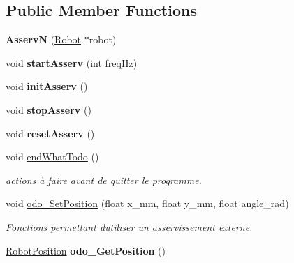 \subsection*{Public Member Functions}
\begin{DoxyCompactItemize}
\item 
\mbox{\label{classAsservN_a9ec913f359490e6840753f10668c7c71}} 
{\bfseries AsservN} (\hyperlink{classRobot}{Robot} $\ast$robot)
\item 
\mbox{\label{classAsservN_a1596b709664aa4a28699b73a931188d3}} 
void {\bfseries start\+Asserv} (int freq\+Hz)
\item 
\mbox{\label{classAsservN_abf37f0e24a183721a424b13ec21911af}} 
void {\bfseries init\+Asserv} ()
\item 
\mbox{\label{classAsservN_a46b2d14de6f0a87194b746d397c09d94}} 
void {\bfseries stop\+Asserv} ()
\item 
\mbox{\label{classAsservN_af84758ee51f6050c7962deaaae54df7b}} 
void {\bfseries reset\+Asserv} ()
\item 
\mbox{\label{classAsservN_a1fc9a48a25f165cb950809d4d88bdb1f}} 
void \hyperlink{classAsservN_a1fc9a48a25f165cb950809d4d88bdb1f}{end\+What\+Todo} ()
\begin{DoxyCompactList}\small\item\em actions à faire avant de quitter le programme. \end{DoxyCompactList}\item 
\mbox{\label{classAsservN_a684b420e77691553692956ba7ab1de3d}} 
void \hyperlink{classAsservN_a684b420e77691553692956ba7ab1de3d}{odo\+\_\+\+Set\+Position} (float x\+\_\+mm, float y\+\_\+mm, float angle\+\_\+rad)
\begin{DoxyCompactList}\small\item\em Fonctions permettant d\textquotesingle{}utiliser un asservissement externe. \end{DoxyCompactList}\item 
\mbox{\label{classAsservN_a6e1a440877cc945340b6160738458539}} 
\hyperlink{structRobotPosition}{Robot\+Position} {\bfseries odo\+\_\+\+Get\+Position} ()

\end{DoxyCompactItemize}
